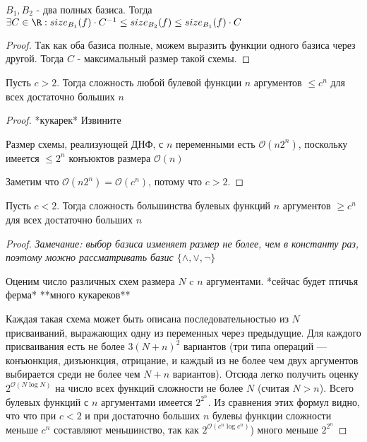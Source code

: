 \begin{theorem}

	$B_1, B_2$ - два полных базиса. Тогда $\exists C \in \R : size_{B_1}(f)\cdot C^{-1} \leq size_{B_2}(f) \leq size_{B_1}(f)\cdot C$
	\begin{proof} \thmslashn
	
		Так как оба базиса полные, можем выразить функции одного базиса через другой. Тогда $C$ - максимальный размер такой схемы.
	\end{proof}
\end{theorem}

\begin{theorem} \thmslashn

	Пусть $c > 2$. Тогда сложность любой булевой функции $n$ аргументов $\leq c^n$ для всех достаточно больших $n$
	\begin{proof} \thmslashn
	
		*кукарек* Извините
		
		Размер схемы, реализующей ДНФ, с $n$ переменными есть $\mathcal{O}(n2^n)$, поскольку имеется $\leq 2^n$ конъюктов размера $\mathcal{O}(n)$
		
		Заметим что $\mathcal{O}(n2^n) = \mathcal{O}(c^n)$, потому что $c > 2$.
	\end{proof}
\end{theorem}

\begin{theorem} \thmslashn

	Пусть $c < 2$. Тогда сложность большинства булевых функций $n$ аргументов $\geq c^n$ для всех достаточно больших $n$
	\begin{proof} \thmslashn
	
		\textit{Замечание: выбор базиса изменяет размер не более, чем в константу раз, поэтому можно рассматривать базис $\{\land, \lor, \neg\}$}
		
		Оценим число различных схем размера $N$ c $n$ аргументами. *сейчас будет птичья ферма* **много кукареков** 
		
		Каждая такая схема может быть описана последовательностью из $N$ присваиваний, 
		выражающих одну из переменных через предыдущие. 
		Для каждого присваивания есть не более $3(N + n)^2$ вариантов
		(три типа операций — конъюнкция, дизъюнкция, отрицание, 
		и каждый из не более чем двух аргументов выбирается среди не более чем $N + n$ вариантов). 
		Отсюда легко получить оценку $2^{\mathcal{O}(N\log N)}$ на число всех функций сложности не более $N$ (считая $N > n$).
		Всего булевых функций с $n$ аргументами имеется $2^{2^n}$. 
		Из сравнения этих формул видно, что что при $c < 2$ и при достаточно больших $n$ булевы функции сложности меньше $c^n$ 
		составляют меньшинство, так как $2^{\mathcal{O}(c^n\log c^n)}$) много меньше $2^{2^n}$
	\end{proof}
\end{theorem}
